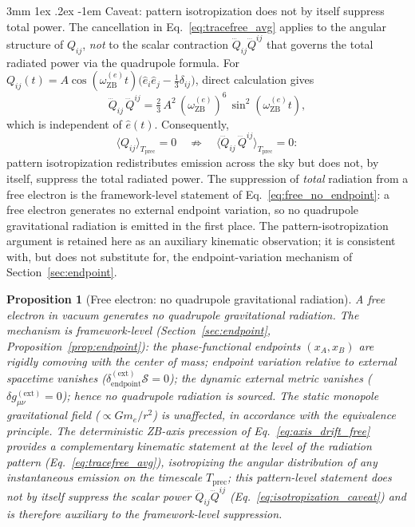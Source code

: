 \documentclass[%
 reprint, amsmath,amssymb, aps, prd, ]{revtex4-2}
\makeatletter
\numberwithin{equation}{section}
\newtheorem{proposition}[theorem]{Proposition}
\renewcommand\paragraph{%
  \@startsection{paragraph}{4}{\z@}%
    {3mm \@plus 1ex \@minus .2ex}%
    {-1em}%
    {\normalfont\normalsize\itshape}}
\newcommand{\omZBe}{\omega_{\mathrm{ZB}}^{(e)}}
\makeatother
\begin{document}
\paragraph{Caveat: pattern isotropization does not by itself suppress total power.}
The cancellation in Eq.~\eqref{eq:tracefree_avg} applies to the angular structure of $Q_{ij}$, \emph{not} to the scalar contraction $\dddot{Q}_{ij}\dddot{Q}^{ij}$ that governs the total radiated power via the quadrupole formula.
For $Q_{ij}(t) = A\cos(\omZBe t)\bigl(\hat{e}_i\hat{e}_j - \tfrac{1}{3}\delta_{ij}\bigr)$, direct calculation gives
\begin{equation}
\dddot{Q}_{ij}\,\dddot{Q}^{ij}
= \tfrac{2}{3}\,A^2\,(\omZBe)^6\,\sin^2(\omZBe t),
\label{eq:dddQ_squared}
\end{equation}
which is independent of $\hat{e}(t)$.
Consequently,
\begin{equation}
\langle Q_{ij}\rangle_{T_\mathrm{prec}} = 0
\quad\not\Rightarrow\quad
\langle \dddot{Q}_{ij}\,\dddot{Q}^{ij}\rangle_{T_\mathrm{prec}} = 0:
\label{eq:isotropization_caveat}
\end{equation}
pattern isotropization redistributes emission across the sky but does not, by itself, suppress the total radiated power.
The suppression of \emph{total} radiation from a free electron is the framework-level statement of Eq.~\eqref{eq:free_no_endpoint}: a free electron generates no external endpoint variation, so no quadrupole gravitational radiation is emitted in the first place.
The pattern-isotropization argument is retained here as an auxiliary kinematic observation; it is consistent with, but does not substitute for, the endpoint-variation mechanism of Section~\ref{sec:endpoint}.

\begin{proposition}[Free electron: no quadrupole gravitational radiation]
\label{prop:free}
A free electron in vacuum generates no quadrupole gravitational radiation.
The mechanism is framework-level (Section~\ref{sec:endpoint}, Proposition~\ref{prop:endpoint}): the phase-functional endpoints $(x_A, x_B)$ are rigidly comoving with the center of mass; endpoint variation relative to external spacetime vanishes ($\delta_\mathrm{endpoint}^{(\mathrm{ext})}\mathcal{S} = 0$); the dynamic external metric vanishes ($\delta g_{\mu\nu}^{(\mathrm{ext})} = 0$); hence no quadrupole radiation is sourced.
The static monopole gravitational field ($\propto Gm_e/r^2$) is unaffected, in accordance with the equivalence principle.
The deterministic ZB-axis precession of Eq.~\eqref{eq:axis_drift_free} provides a complementary kinematic statement at the level of the radiation pattern (Eq.~\eqref{eq:tracefree_avg}), isotropizing the angular distribution of any instantaneous emission on the timescale $T_\mathrm{prec}$; this pattern-level statement does not by itself suppress the scalar power $\dddot{Q}_{ij}\dddot{Q}^{ij}$ (Eq.~\eqref{eq:isotropization_caveat}) and is therefore auxiliary to the framework-level suppression.
\end{proposition}
\end{document}
